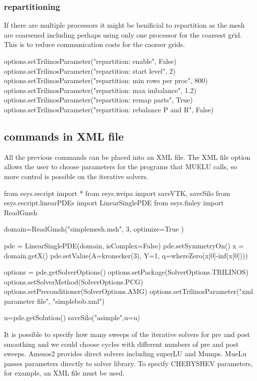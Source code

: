 \subsubsection{repartitioning}
If there are multiple processors it might be benificial to repartition as the mesh are coarsened including perhaps using only one processor for the coarsest grid.  This is to reduce communication costs for the caorser grids.
\begin{python}
options.setTrilinosParameter("repartition: enable", False)
options.setTrilinosParameter("repartition: start level", 2)
options.setTrilinosParameter("repartition: min rows per proc", 800)
options.setTrilinosParameter("repartition: max imbalance", 1.2)
options.setTrilinosParameter("repartition: remap parts", True)
options.setTrilinosParameter("repartition: rebalance P and R", False)
\end{python}


\subsection{commands in XML file}
All the previous commands can be placed into an XML file.  The XML file option allows the user to choose parameters for the programs that MUELU calls, so more control is possible on the iterative solvers.
\begin{python}
from esys.escript import *
from esys.weipa import saveVTK, saveSilo
from esys.escript.linearPDEs import LinearSinglePDE
from esys.finley import ReadGmsh

domain=ReadGmsh("simplemesh.msh", 3,  optimize=True )

pde = LinearSinglePDE(domain, isComplex=False)
pde.setSymmetryOn()
x = domain.getX()
pde.setValue(A=kronecker(3), Y=1, q=whereZero(x[0]-inf(x[0])))

options = pde.getSolverOptions()
options.setPackage(SolverOptions.TRILINOS)
options.setSolverMethod(SolverOptions.PCG)
options.setPreconditioner(SolverOptions.AMG)
options.setTrilinosParameter("xml parameter file", "simplebob.xml")

u=pde.getSolution()    
saveSilo("asimple",u=u) 
\end{python}

It is possible to specify how many sweeps of the iterative solvers for pre and post smoothing and we could choose cycles with different numbers of pre and post sweeps.  Amesos2 provides direct solvers including superLU and Mumps. MueLu passes parameters directly to solver library.  To specify CHEBYSHEV parameters, for example, an XML file must be used.

